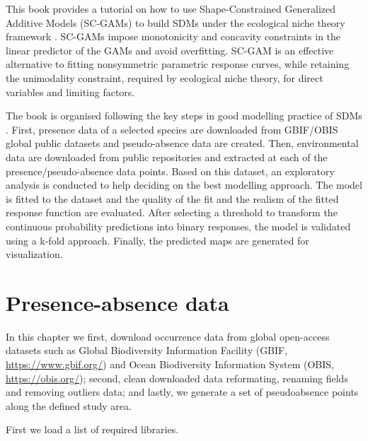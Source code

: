\documentclass[
]{book}
\begin{document}
This book provides a tutorial on how to use Shape-Constrained Generalized Additive Models (SC-GAMs) to build SDMs under the ecological niche theory framework \citep{citores_etal_2020}. SC-GAMs impose monotonicity and concavity constraints in the linear predictor of the GAMs and avoid overfitting. SC-GAM is an effective alternative to fitting nonsymmetric parametric response curves, while retaining the unimodality constraint, required by ecological niche theory, for direct variables and limiting factors.

The book is organised following the key steps in good modelling practice of SDMs \citep{elith_etal_2009}. First, presence data of a selected species are downloaded from GBIF/OBIS global public datasets and pseudo-absence data are created. Then, environmental data are downloaded from public repositories and extracted at each of the presence/pseudo-absence data points. Based on this dataset, an exploratory analysis is conducted to help deciding on the best modelling approach. The model is fitted to the dataset and the quality of the fit and the realism of the fitted response function are evaluated. After selecting a threshold to transform the continuous probability predictions into binary responses, the model is validated using a k-fold approach. Finally, the predicted maps are generated for visualization.

\chapter{Presence-absence data}\label{presence-absence-data}

In this chapter we first, download occurrence data from global open-access datasets such as Global Biodiversity Information Facility (GBIF, \url{https://www.gbif.org/}) and Ocean Biodiversity Information System (OBIS, \url{https://obis.org/}); second, clean downloaded data reformating, renaming fields and removing outliers data; and lastly, we generate a set of pseudoabsence points along the defined study area.

First we load a list of required libraries.
\end{document}
